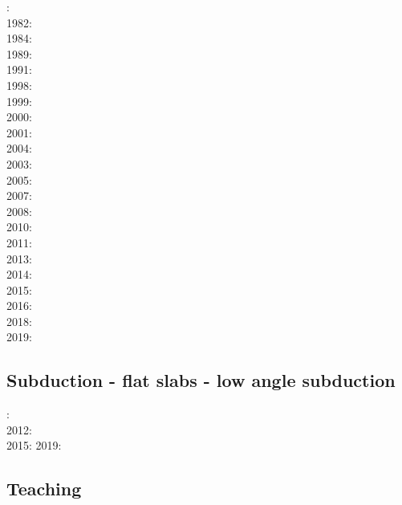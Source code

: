 : \cite{bird78}\\
1982: \cite{clwv82}\\
1984: \cite{cade84}\\
1989: \cite{clwv89}\\
1991: \cite{muph91}\\
1998: \cite{togu98}\\
1999: \cite{fagd99}\\
2000: \cite{pybf00}\\
2001: \cite{dohe01}\cite{reyb01}\cite{brry01}\\
2004: \cite{ster04}\cite{guhl04}\\
2003: \cite{hags03}\\
2005: \cite{bihi05}\\
2007: \cite{kore07}\\
2008: \cite{uegs08}\\
2010: \cite{nigm10}\cite{bucl10}\\
2011: \cite{bagw11}\cite{nigm11}\\
2013: \cite{dyge13}\cite{mana13}\cite{kore13}\\
2014: \cite{recf14}\cite{macg14}\\
2015: \cite{matv15}\cite{pebu15}\cite{vapm15}\\
2016: \cite{crta16}\\
2018: \cite{zhlg18}\cite{basq18}\\
2019: \cite{begb19}\cite{gubg19}\cite{ulcw19}

\subsection*{Subduction - flat slabs - low angle subduction}

: \cite{cube11}\\
2012: \cite{mapm12}\\
2015: \cite{gehm15}\cite{tarn15}
2019: \cite{sifg19}\cite{sams19b}

\subsection*{Teaching} 

\cite{kerh14}

